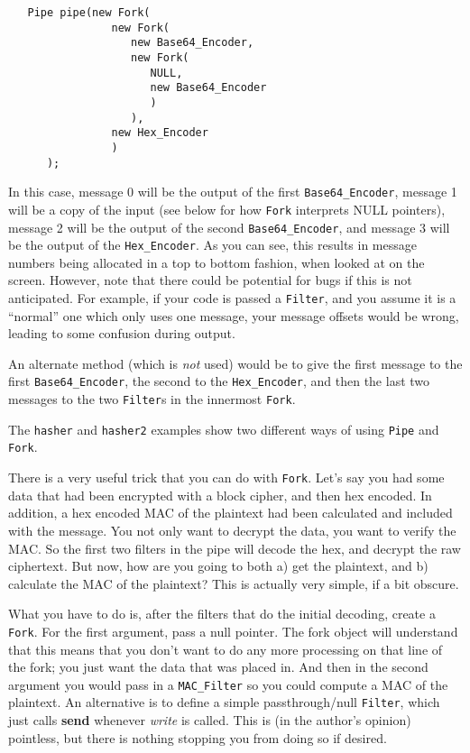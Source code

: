 \documentclass{article}
\newcommand{\filename}[1]{\texttt{#1}}
\newcommand{\function}[1]{\textbf{#1}}
\newcommand{\type}[1]{\texttt{#1}}
\renewcommand{\arg}[1]{\textsl{#1}}
\begin{document}
\begin{verbatim}
   Pipe pipe(new Fork(
                new Fork(
                   new Base64_Encoder,
                   new Fork(
                      NULL,
                      new Base64_Encoder
                      )
                   ),
                new Hex_Encoder
                )
      );
\end{verbatim}

In this case, message 0 will be the output of the first \type{Base64\_Encoder},
message 1 will be a copy of the input (see below for how \type{Fork} interprets
NULL pointers), message 2 will be the output of the second
\type{Base64\_Encoder}, and message 3 will be the output of the
\type{Hex\_Encoder}. As you can see, this results in message numbers being
allocated in a top to bottom fashion, when looked at on the screen. However,
note that there could be potential for bugs if this is not anticipated. For
example, if your code is passed a \type{Filter}, and you assume it is a
``normal'' one which only uses one message, your message offsets would be
wrong, leading to some confusion during output.

An alternate method (which is \emph{not} used) would be to give the first
message to the first \type{Base64\_Encoder}, the second to the
\type{Hex\_Encoder}, and then the last two messages to the two \type{Filter}s
in the innermost \type{Fork}.

The \filename{hasher} and \filename{hasher2} examples show two different ways
of using \type{Pipe} and \type{Fork}.

There is a very useful trick that you can do with \type{Fork}. Let's say you
had some data that had been encrypted with a block cipher, and then hex
encoded. In addition, a hex encoded MAC of the plaintext had been calculated
and included with the message. You not only want to decrypt the data, you want
to verify the MAC. So the first two filters in the pipe will decode the hex,
and decrypt the raw ciphertext. But now, how are you going to both a) get the
plaintext, and b) calculate the MAC of the plaintext? This is actually very
simple, if a bit obscure.

What you have to do is, after the filters that do the initial decoding, create
a \type{Fork}. For the first argument, pass a null pointer. The fork object
will understand that this means that you don't want to do any more processing
on that line of the fork; you just want the data that was placed in. And then
in the second argument you would pass in a \type{MAC\_Filter} so you could
compute a MAC of the plaintext. An alternative is to define a simple
passthrough/null \type{Filter}, which just calls \function{send} whenever
\arg{write} is called. This is (in the author's opinion) pointless, but there
is nothing stopping you from doing so if desired.
\end{document}

